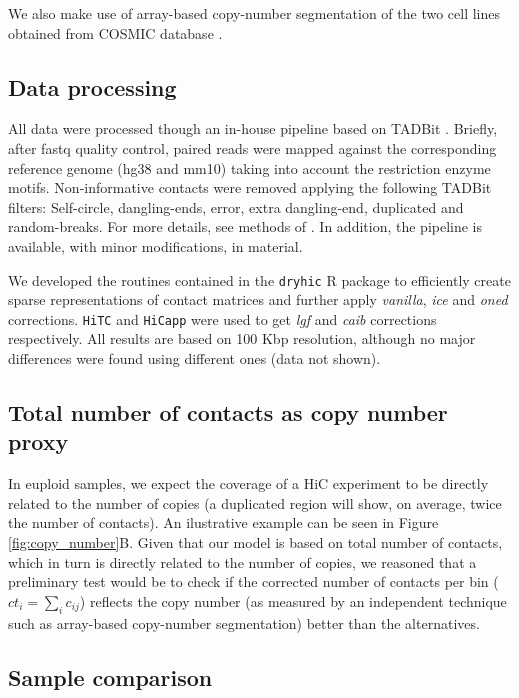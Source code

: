 \documentclass{bioinfo}
\begin{document}
\begin{methods}
We also make use of array-based copy-number segmentation of the two cell lines obtained from COSMIC database \citep{forbes2010cosmic}.

\subsection{Data processing}

All data were processed though an in-house pipeline based on TADBit \citep{serra2016structural}. Briefly, after fastq quality control, paired reads were mapped against the corresponding reference genome (hg38 and mm10) taking into account the restriction enzyme motifs. Non-informative contacts were removed applying the following TADBit \citep{serra2016structural} filters: Self-circle, dangling-ends, error, extra dangling-end, duplicated and random-breaks. For more details, see methods of \cite{stadhouders2017transcription}. In addition, the pipeline is available, with minor modifications, in \cite{quilez2017managing} material.

We developed the routines contained in the \texttt{dryhic} R package to efficiently create sparse representations of contact matrices and further apply \textit{vanilla}, \textit{ice} and \textit{oned} corrections. \texttt{HiTC} \citep{servant2012hitc} and \texttt{HiCapp} \citep{wu2016computational} were used to get \textit{lgf} and \textit{caib} corrections respectively. All results are based on 100 Kbp resolution, although no major differences were found using different ones (data not shown).


\subsection{Total number of contacts as copy number proxy}

In euploid samples, we expect the coverage of a HiC experiment to be directly related to the number of copies (a duplicated region will show, on average, twice the number of contacts). An ilustrative example can be seen in Figure \ref{fig:copy_number}B. Given that our model is based on total number of contacts, which in turn is directly related to the number of copies, we reasoned that a preliminary test would be to check if the corrected number of contacts per bin ($ct_i = \sum_{i}{c_{ij}}$) reflects the copy number (as measured by an independent technique such as array-based copy-number segmentation) better than the alternatives.


\subsection{Sample comparison}


\end{methods}
\end{document}
